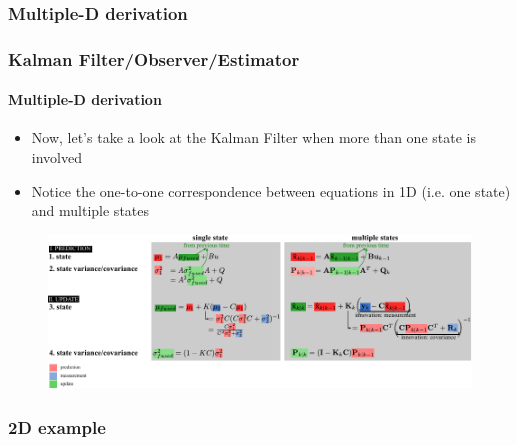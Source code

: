 \subsubsection{Multiple-D derivation}
\begin{frame}[plain]\pw\Large
\frametitle{Kalman Filter/Observer/Estimator}
\framesubtitle{Multiple-D derivation}


\begin{itemize}\scriptsize
\item Now, let's take a look at the Kalman Filter when more than one state is involved
\item Notice the one-to-one correspondence between equations in 1D (i.e. one state) and multiple states
\end{itemize}
\begin{figure}[h]
\centering
\includegraphics[width=1.4\textwidth]{figs/TRK_KalmanFilter_equations-2D.pdf}
\end{figure}

\end{frame}


\subsubsection{2D example}


